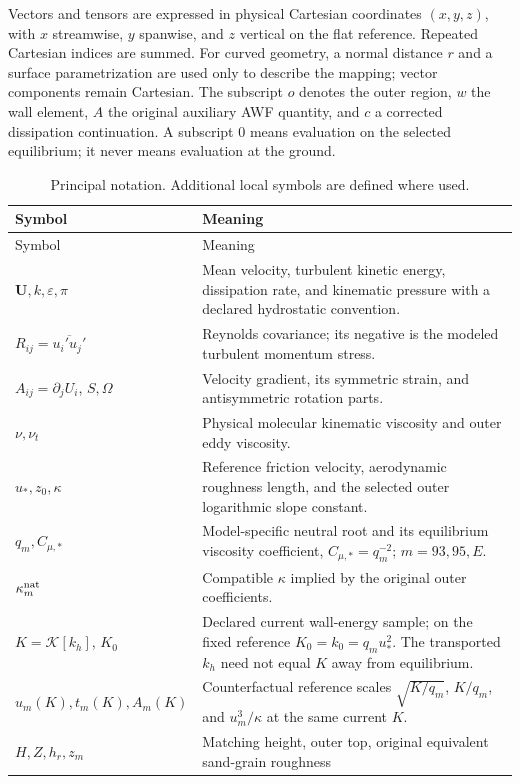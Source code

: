\documentclass[11pt,a4paper]{article}
\numberwithin{equation}{section}
\newcommand{\eps}{\varepsilon}
\newcommand{\ust}{u_*}
\newcommand{\nut}{\nu_t}
\renewcommand{\arraystretch}{1.15}
\begin{document}
Vectors and tensors are expressed in physical Cartesian coordinates
$(x,y,z)$, with $x$ streamwise, $y$ spanwise, and $z$ vertical on the
flat reference. Repeated Cartesian indices are summed. For curved
geometry, a normal distance $r$ and a surface parametrization are used
only to describe the mapping; vector components remain Cartesian.
The subscript $o$ denotes the outer region, $w$ the wall element,
$A$ the original auxiliary AWF quantity, and $c$ a corrected
dissipation continuation. A subscript $0$ means evaluation on the
selected equilibrium; it never means evaluation at the ground.

{\small
\renewcommand{\arraystretch}{1.05}
\begin{longtable}{@{}p{}p{}@{}}
\caption{Principal notation. Additional local symbols are defined where used.}
\label{tab:notation}\\
\toprule Symbol & Meaning\\ \midrule
\endfirsthead
\toprule Symbol & Meaning\\ \midrule
\endhead
$\boldsymbol U,k,\eps,\pi$ &
Mean velocity, turbulent kinetic energy, dissipation rate, and
kinematic pressure with a declared hydrostatic convention.\\
$R_{ij}=\overline{u_i'u_j'}$ &
Reynolds covariance; its negative is the modeled turbulent momentum stress.\\
$A_{ij}=\partial_jU_i$, $S,\Omega$ &
Velocity gradient, its symmetric strain, and antisymmetric rotation parts.\\
$\nu,\nut$ &
Physical molecular kinematic viscosity and outer eddy viscosity.\\
$\ust,z_0,\kappa$ &
Reference friction velocity, aerodynamic roughness length, and the
selected outer logarithmic slope constant.\\
$q_m,C_{\mu,*}$ &
Model-specific neutral root and its equilibrium viscosity coefficient,
$C_{\mu,*}=q_m^{-2}$; $m=93,95,E$.\\
$\kappa_m^{\rm nat}$ &
Compatible $\kappa$ implied by the original outer coefficients.\\
$K=\mathcal K[k_h]$, $K_0$ &
Declared current wall-energy sample; on the fixed reference
$K_0=k_0=q_m\ust^2$. The transported $k_h$ need not equal $K$
away from equilibrium.\\
$u_m(K),t_m(K),A_m(K)$ &
Counterfactual reference scales $\sqrt{K/q_m}$, $K/q_m$,
and $u_m^3/\kappa$ at the same current $K$.\\
$H,Z,h_r,z_m$ &
Matching height, outer top, original equivalent sand-grain roughness

\end{longtable}}
\end{document}
